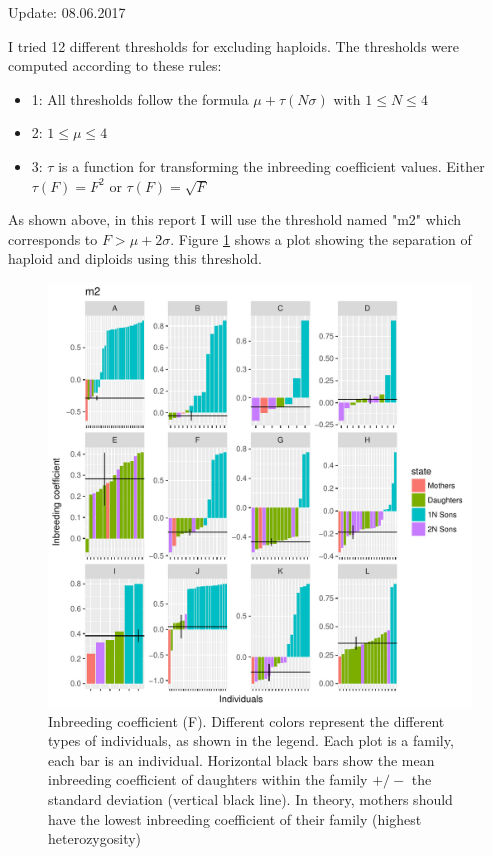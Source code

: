\documentclass[10pt,a4paper]{report}
\begin{document}
Update: 08.06.2017

I tried 12 different thresholds for excluding haploids. The thresholds were computed according to these rules:
\begin{itemize}
\item 1: All thresholds follow the formula $\mu + \tau(N\sigma)$ with $1 \leq N \leq 4$
\item 2:  $1 \leq \mu \leq 4$
\item 3: $\tau$ is a function for transforming the inbreeding coefficient values. Either $\tau(F) = F^2$ or $\tau(F) = \sqrt{F}$
\end{itemize}
As shown above, in this report I will use the threshold named "m2" which corresponds to  $F > \mu + 2\sigma $.
Figure \ref{haplodiplo} shows a plot showing the separation of haploid and diploids using this threshold.

\begin{figure}[h]
	\begin{center}
		\hspace*{-0.8in}
		\includegraphics[width=1.2\textwidth]{exclu_haplo/m2}
		
		\caption{Inbreeding coefficient (F). Different colors represent the different types of individuals, as shown in the legend. Each plot is a family, each bar is an individual. Horizontal black bars show the mean inbreeding coefficient of daughters within the family $+/-$ the standard deviation (vertical black line). In theory, mothers should have the lowest inbreeding coefficient of their family (highest heterozygosity)}
		\label{haplodiplo}
	\end{center}
\end{figure}
\end{document}
